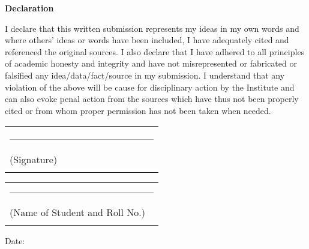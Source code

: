 \graphicspath{ {images/} }
\thispagestyle{empty}
\vspace*{0.2cm}
\vspace{1cm}
\begin{center}
 \large\textbf{Declaration}
\end{center}
\vspace{1cm}
\hspace{5mm} I declare that this written submission represents my ideas in my own words 
and where others' ideas or words have been included, I have adequately cited and referenced the original sources. I also declare that I have adhered to all 
principles of academic honesty and integrity and have not misrepresented 
or fabricated or falsified any idea/data/fact/source in my submission. I understand that any violation of the above will be cause for disciplinary action by the Institute and can also evoke penal action from the sources which have thus not been properly cited or from whom proper permission has not been taken when needed. 

\hfill
\begin{tabular}{@{}l@{}}
\vspace{10 mm}\\
---------------------------------------------\\
\vspace{0.5 mm}\\
\hspace{22 mm} (Signature)\\
\vspace{5 mm}
\end{tabular}

\hfill
\begin{tabular}{@{}l@{}}
---------------------------------------------\\
\vspace{0.5 mm}\\
\hspace{1 mm} (Name of Student and Roll No.)\\
\vspace{5 mm}
\end{tabular}


Date:

\clearpage